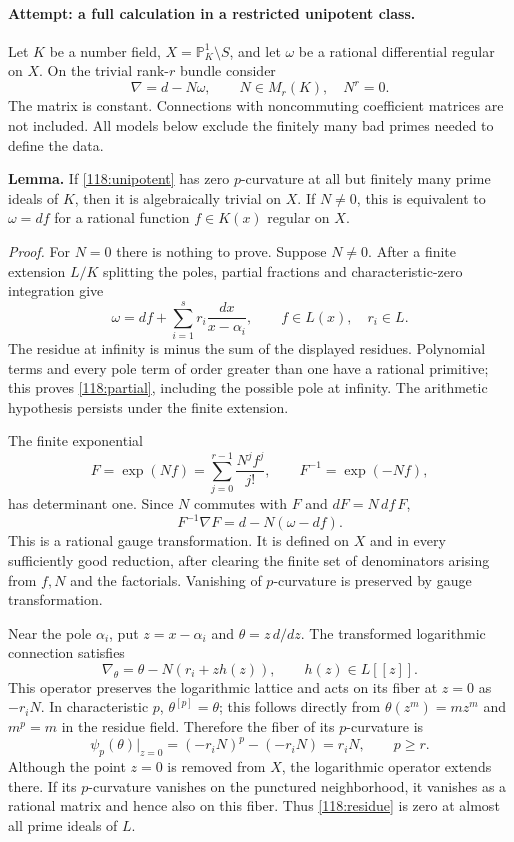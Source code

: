 \documentclass[11pt,a4paper]{article}
\newcommand{\PP}{\mathbb P}
\numberwithin{equation}{section}
\begin{document}
\paragraph{Attempt: a full calculation in a restricted unipotent class.}
Let $K$ be a number field,
$X=\PP^1_K\setminus S$, and let $\omega$ be a rational differential regular
on $X$. On the trivial rank-$r$ bundle consider
\begin{equation}\label{118:unipotent}
 \nabla=d-N\omega,\qquad
 N\in M_r(K),\quad N^r=0.
\end{equation}
The matrix is constant. Connections with noncommuting coefficient matrices
are not included. All models below exclude the finitely many bad primes
needed to define the data.

\textbf{Lemma.}
If \eqref{118:unipotent} has zero $p$-curvature at all but finitely many prime
ideals of $K$, then it is algebraically trivial on $X$. If $N\ne0$, this is
equivalent to $\omega=df$ for a rational function $f\in K(x)$ regular on $X$.

\emph{Proof.}
For $N=0$ there is nothing to prove. Suppose $N\ne0$. After a finite extension
$L/K$ splitting the poles, partial fractions and characteristic-zero
integration give
\begin{equation}\label{118:partial}
 \omega=df+\sum_{i=1}^s r_i\frac{dx}{x-\alpha_i},
 \qquad f\in L(x),\quad r_i\in L.
\end{equation}
The residue at infinity is minus the sum of the displayed residues. Polynomial
terms and every pole term of order greater than one have a rational primitive;
this proves \eqref{118:partial}, including the possible pole at infinity.
The arithmetic hypothesis persists under the finite extension.

The finite exponential
\begin{equation}\label{118:gauge}
 F=\exp(Nf)=\sum_{j=0}^{r-1}\frac{N^jf^j}{j!},
 \qquad F^{-1}=\exp(-Nf),
\end{equation}
has determinant one. Since $N$ commutes with $F$ and $dF=N\,df\,F$,
\[
 F^{-1}\nabla F=d-N(\omega-df).
\]
This is a rational gauge transformation. It is defined on $X$ and in every
sufficiently good reduction, after clearing the finite set of denominators
arising from $f,N$ and the factorials. Vanishing of $p$-curvature is
preserved by gauge transformation.

Near the pole $\alpha_i$, put $z=x-\alpha_i$ and
$\theta=z\,d/dz$. The transformed logarithmic connection satisfies
\[
 \nabla_\theta=\theta-N(r_i+zh(z)),\qquad h(z)\in L[\![z]\!].
\]
This operator preserves the logarithmic lattice and acts on its fiber
at $z=0$ as $-r_iN$. In characteristic $p$, $\theta^{[p]}=\theta$;
this follows directly from $\theta(z^m)=mz^m$ and $m^p=m$ in the residue
field. Therefore the fiber of its $p$-curvature is
\begin{equation}\label{118:residue}
 \psi_p(\theta)\big|_{z=0}=(-r_iN)^p-(-r_iN)=r_iN,
 \qquad p\ge r.
\end{equation}
Although the point $z=0$ is removed from $X$, the logarithmic operator extends
there. If its $p$-curvature vanishes on the punctured neighborhood, it vanishes
as a rational matrix and hence also on this fiber. Thus \eqref{118:residue}
is zero at almost all prime ideals of $L$.
\end{document}
